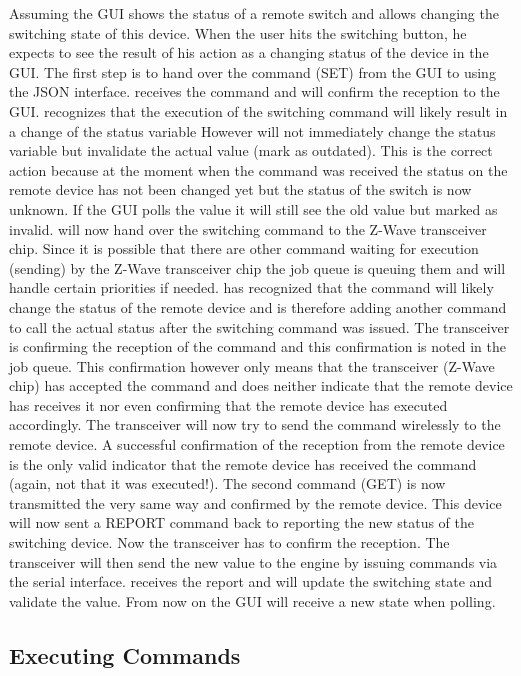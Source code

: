 Assuming the GUI shows the status of a remote switch and allows changing the switching 
state of this device. When the user hits the switching button, he expects to see the 
result of his action as a changing status of the device in the GUI. The first step is 
to hand over the command (SET) from the GUI to \zway using the JSON interface. \zway 
receives the command and will confirm the reception to the GUI. \zway recognizes that 
the execution of the switching command will likely result in a change of the status 
variable However \zway will not immediately change the status variable but invalidate 
the actual value (mark as outdated). This is the correct action because at the moment 
when the command was received the status on the remote device has not been changed yet 
but the status of the switch is now unknown.
If the GUI polls the value it will still see the old value but marked as invalid. \zway 
will now hand over the switching command to the Z-Wave transceiver chip. Since it is 
possible that there are other command waiting for execution (sending) by the Z-Wave 
transceiver chip the job queue is queuing them and will handle certain priorities if 
needed. \zway has recognized that the command will likely change the status of the remote 
device and is therefore adding another command to call the actual status after the 
switching command was issued.
The transceiver is confirming the reception of the command and this confirmation is noted 
in the job queue. This confirmation however only means that the transceiver (Z-Wave chip) 
has accepted the command and does neither indicate that the remote device has receives it 
nor even confirming that the remote device has executed accordingly.
The transceiver will now try to send the command wirelessly to the remote device. A 
successful confirmation of the reception from the remote device is the only valid indicator
 that the remote device has received the command (again, not that it was executed!).
The second command (GET) is now transmitted the very same way and confirmed by the 
remote device. This device will now sent a REPORT command back to \zway reporting the 
new status of the switching device. Now the transceiver has to confirm the reception. 
The transceiver will then send the new value to the \zway engine by issuing commands 
via the serial interface. \zway receives the report and will update the switching 
state and validate the value. From now on the GUI will receive a new state when polling.

\subsection{Executing Commands}
\label{jsapiexec}

